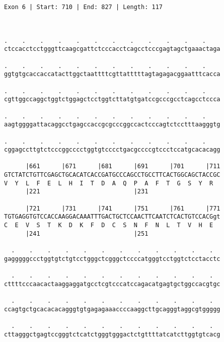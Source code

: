 \documentclass{article}
\begin{document}
\begin{Verbatim}
Exon 6 | Start: 710 | End: 827 | Length: 117



.    .    .    .    .    .    .    .    .    .    .    .    
ctccacctcctgggttcaagcgattctcccacctcagcctcccgagtagctgaaactaga
                                                            
.    .    .    .    .    .    .    .    .    .    .    .    
ggtgtgcaccaccatacttggctaattttcgttatttttagtagagacggaatttcacca
                                                            
.    .    .    .    .    .    .    .    .    .    .    .    
cgttggccaggctggtctggagctcctggtcttatgtgatccgcccgcctcagcctccca
                                                            
.    .    .    .    .    .    .    .    .    .    .    .    
aagtggggattacaggcctgagccaccgcgcccggccactcccagtctcctttaagggtg
                                                            
.    .    .    .    .    .    .    .    .    .    .    .    
cggagccttgtctcccggcccctggtgtcccctgacgccccgtccctccatgcacacagg
                                                            
      |661      |671      |681      |691      |701      |711
GTCTATCTGTTCGAGCTGCACATCACCGATGCCCAGCCTGCCTTCACTGGCAGCTACCGC
V  Y  L  F  E  L  H  I  T  D  A  Q  P  A  F  T  G  S  Y  R  
      |221                          |231                    
  
      |721      |731      |741      |751      |761      |771
TGTGAGGTGTCCACCAAGGACAAATTTGACTGCTCCAACTTCAATCTCACTGTCCACGgt
C  E  V  S  T  K  D  K  F  D  C  S  N  F  N  L  T  V  H  E  
      |241                          |251                    
  
  .    .    .    .    .    .    .    .    .    .    .    .  
gagggggccctggtgtctgtcctgggctcgggctccccatgggtcctggtctcctacctc
                                                            
  .    .    .    .    .    .    .    .    .    .    .    .  
cttttcccaacactaaggaggatgcctcgtcccatccagacatgagtgctggccacgtgc
                                                            
  .    .    .    .    .    .    .    .    .    .    .    .  
ccagtgctgcacacacagggtgtgagagaaaccccaaggcttgcagggtaggcgtggggg
                                                            
  .    .    .    .    .    .    .    .    .    .    .    .  
cttagggctgagtccgggtctcatctgggtgggactctgttttatcatcttggtgtcacg
                                                            

\end{Verbatim}
\end{document}
